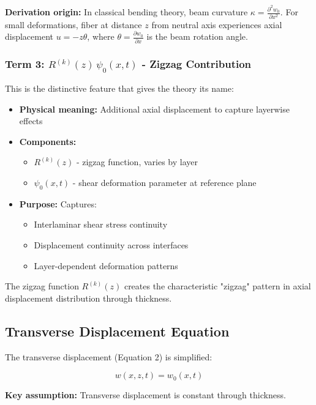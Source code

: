 \documentclass[12pt,a4paper]{article}
\begin{document}
\textbf{Derivation origin:} In classical bending theory, beam curvature $\kappa = \frac{\partial^2 w_0}{\partial x^2}$. For small deformations, fiber at distance $z$ from neutral axis experiences axial displacement $u = -z \theta$, where $\theta = \frac{\partial w_0}{\partial x}$ is the beam rotation angle.

\subsubsection{Term 3: $R^{(k)}(z) \, \psi_0(x,t)$ - Zigzag Contribution}

This is the distinctive feature that gives the theory its name:

\begin{itemize}
\item \textbf{Physical meaning:} Additional axial displacement to capture layerwise effects
\item \textbf{Components:}
    \begin{itemize}
    \item $R^{(k)}(z)$ - zigzag function, varies by layer
    \item $\psi_0(x,t)$ - shear deformation parameter at reference plane
    \end{itemize}
\item \textbf{Purpose:} Captures:
    \begin{itemize}
    \item Interlaminar shear stress continuity
    \item Displacement continuity across interfaces
    \item Layer-dependent deformation patterns
    \end{itemize}
\end{itemize}

The zigzag function $R^{(k)}(z)$ creates the characteristic "zigzag" pattern in axial displacement distribution through thickness.

\subsection{Transverse Displacement Equation}

The transverse displacement (Equation 2) is simplified:

\begin{equation}
   w(x,z,t) = w_0(x,t)
   \label{eq:transverse_displacement}
\end{equation}

\textbf{Key assumption:} Transverse displacement is constant through thickness.
\end{document}
